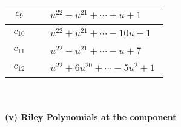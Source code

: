 \documentclass[1p]{elsarticle_modified}
\theoremstyle{definition}
\begin{document}
\begin{tabular}{m{50pt}|m{274pt}}
\hline $$\begin{aligned}c_{9}\end{aligned}$$&$\begin{aligned}
&u^{22}- u^{21}+\cdots+u+1
\end{aligned}$\\
\hline $$\begin{aligned}c_{10}\end{aligned}$$&$\begin{aligned}
&u^{22}+u^{21}+\cdots-10 u+1
\end{aligned}$\\
\hline $$\begin{aligned}c_{11}\end{aligned}$$&$\begin{aligned}
&u^{22}- u^{21}+\cdots- u+7
\end{aligned}$\\
\hline $$\begin{aligned}c_{12}\end{aligned}$$&$\begin{aligned}
&u^{22}+6 u^{20}+\cdots-5 u^2+1
\end{aligned}$\\
\hline
\end{tabular}\\~\\
\newpage\renewcommand{\arraystretch}{1}
\flushleft \textbf{(v) Riley Polynomials at the component}\newline \\
\end{document}
